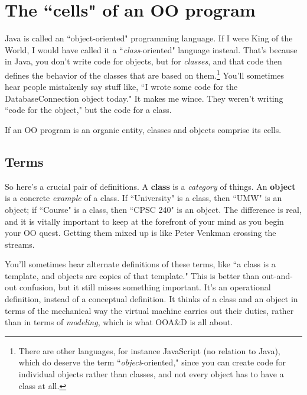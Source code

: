 
\chapter{The ``cells" of an OO program}
\label{ch:cells}


Java is called an ``object-oriented" programming language. If I were King of
the World, I would have called it a ``\textit{class}-oriented" language
instead. That's because in Java, you don't write code for objects, but for
\textit{classes}, and that code then defines the behavior of the classes that
are based on them.\footnote{There are other languages, for instance JavaScript
(no relation to Java), which do deserve the term ``\textit{object}-oriented,"
since you can create code for individual objects rather than classes, and not
every object has to have a class at all.} You'll sometimes hear people
mistakenly say stuff like, ``I wrote some code for the DatabaseConnection
object today." It makes me wince. They weren't writing ``code for the
object," but the code for a class.

If an OO program is an organic entity, classes and objects comprise its cells.

\section{Terms}

So here's a crucial pair of definitions. A \textbf{class} is a
\textit{category} of things. An \textbf{object} is a concrete \textit{example}
of a class. If ``University" is a class, then ``UMW" is an object; if
``Course" is a class, then ``CPSC 240" is an object. The difference is real,
and it is vitally important to keep at the forefront of your mind as you begin
your OO quest. Getting them mixed up is like Peter Venkman crossing the
streams.

You'll sometimes hear alternate definitions of these terms, like ``a class is
a template, and objects are copies of that template." This is better than
out-and-out confusion, but it still misses something important. It's an
operational definition, instead of a conceptual definition. It thinks of a
class and an object in terms of the mechanical way the virtual machine carries
out their duties, rather than in terms of \textit{modeling}, which is what
OOA\&D is all about.

